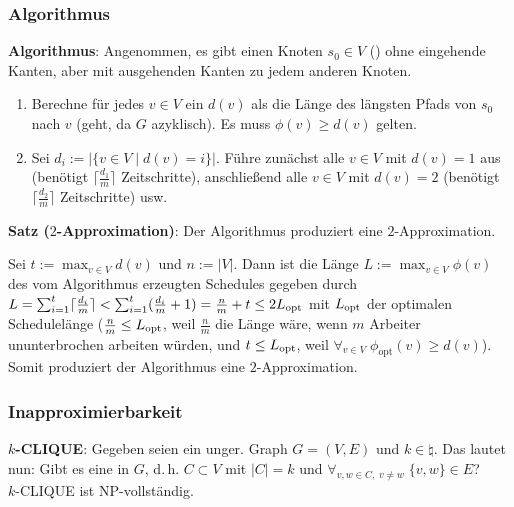 \subsubsection{%
    Algorithmus%
}

\textbf{Algorithmus}:
Angenommen, es gibt einen Knoten $s_0 \in V$ ()
ohne eingehende Kanten, aber mit ausgehenden Kanten zu jedem anderen Knoten.
\begin{enumerate}
    \item
    Berechne für jedes $v \in V$ ein  $d(v)$ als
    die Länge des längsten Pfads von $s_0$ nach $v$ (geht, da $G$ azyklisch).
    Es muss $\phi(v) \ge d(v)$ gelten.
    
    \item
    Sei $d_i := |\{v \in V \;|\; d(v) = i\}|$.
    Führe zunächst alle $v \in V$ mit $d(v) = 1$ aus
    (benötigt $\lceil\frac{d_1}{m}\rceil$ Zeitschritte),
    anschließend alle $v \in V$ mit $d(v) = 2$
    (benötigt $\lceil\frac{d_2}{m}\rceil$ Zeitschritte) usw.
\end{enumerate}

\textbf{Satz ($2$-Approximation)}:
Der Algorithmus produziert eine $2$-Approximation.

\begin{Beweis}
    Sei $t := \max_{v \in V} d(v)$ und $n := |V|$.
    Dann ist die Länge $L := \max_{v \in V} \phi(v)$ des
    vom Algorithmus erzeugten Schedules gegeben durch
    $L
    = \sum_{i=1}^t \lceil\frac{d_i}{m}\rceil
    < \sum_{i=1}^t (\frac{d_i}{m} + 1)
    = \frac{n}{m} + t
    \le 2L_{\text{opt}}$
    mit $L_{\text{opt}}$ der optimalen Schedulelänge
    ($\frac{n}{m} \le L_{\text{opt}}$, weil $\frac{n}{m}$ die Länge wäre,
    wenn $m$ Arbeiter ununterbrochen arbeiten würden, und
    $t \le L_{\text{opt}}$, weil $\forall_{v \in V}\; \phi_{\text{opt}}(v) \ge d(v)$).
    Somit produziert der Algorithmus eine $2$-Approximation.
\end{Beweis}

\pagebreak

\subsubsection{%
    Inapproximierbarkeit%
}

\textbf{$k$-CLIQUE}:
Gegeben seien ein unger. Graph $G = (V, E)$ und $k \in \natural$.
Das  lautet nun:
Gibt es eine  in $G$, d.\,h. $C \subset V$ mit $|C| = k$ und
$\forall_{v, w \in C,\; v \not= w}\; \{v, w\} \in E$?\\
$k$-CLIQUE ist NP-vollständig.

